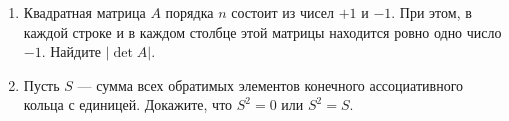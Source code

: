 \begin{enumerate}
\item Квадратная матрица $A$ порядка $n$ состоит из чисел $+1$ и $-1$. При этом, в каждой строке и в каждом столбце этой матрицы находится ровно одно число $-1$. Найдите $|\det A|$.

\item Пусть $S$ --- сумма всех обратимых элементов конечного ассоциативного кольца с единицей. Докажите, что $S^2=0$ или $S^2=S$.
\end{enumerate}
